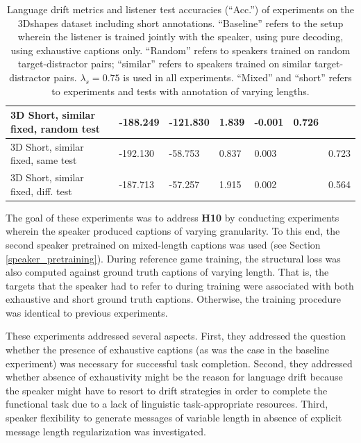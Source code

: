 \begin{table}[]
\begin{tabularx}{\textwidth}{|X|l|l|X|X|X|X|}
		3D Short, similar fixed, random test&      -188.249           &     -121.830                  &             1.839         &         -0.001             &                   0.726                       &                                        \\ \hline
		3D Short, similar fixed, same test&      -192.130      &     -58.753      &   0.837      & 0.003      &                       &               0.723                           \\ \hline
		3D Short, similar fixed, diff. test &  -187.713       & -57.257     & 1.915        &  0.002         &      &     0.564       \\ \hline
	\end{tabularx}
	\caption{\label{tab:3dshapes_drift_metrics_basic_short} Language drift metrics and listener test accuracies (``Acc.'') of experiments on the 3Dshapes dataset including short annotations. 
		``Baseline'' refers to the setup wherein the listener is trained jointly with the speaker, using pure decoding, using exhaustive captions only. ``Random'' refers to speakers trained on random target-distractor pairs; ``similar'' refers to speakers trained on similar target-distractor pairs. $\lambda_s = 0.75$ is used in all experiments. ``Mixed'' and ``short'' refers to experiments and tests with annotation of varying lengths.}
\end{table}

The goal of these experiments was to address \textbf{H10} by conducting experiments wherein the speaker produced captions of varying granularity.
To this end, the second speaker pretrained on mixed-length captions was used (see Section \ref{speaker_pretraining}). During reference game training, the structural loss was also computed against ground truth captions of varying length. That is, the targets that the speaker had to refer to during training were associated with both exhaustive and short ground truth captions. Otherwise, the training procedure was identical to previous experiments.

These experiments addressed several aspects. First, they addressed the question whether the presence of exhaustive captions (as was the case in the baseline experiment) was necessary for successful task completion. Second, they addressed whether absence of exhaustivity might be the reason for language drift because the speaker might have to resort to drift strategies in order to complete the functional task due to a lack of linguistic task-appropriate resources. 
Third, speaker flexibility to generate messages of variable length in absence of explicit message length regularization was investigated. 

